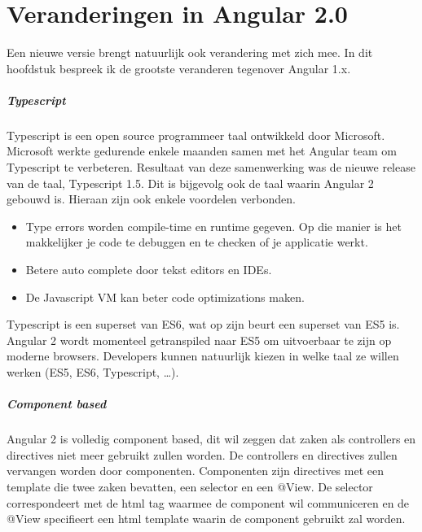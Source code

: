 \documentclass[pdftex,a4paper,12pt,twoside]{report}
\begin{document}
\chapter{Veranderingen in Angular 2.0}
\label{ch:veranderingen}
Een nieuwe versie brengt natuurlijk ook verandering met zich mee. In dit hoofdstuk bespreek ik de grootste veranderen tegenover Angular 1.x.

\paragraph{Typescript}
Typescript is een open source programmeer taal ontwikkeld door Microsoft. Microsoft werkte gedurende enkele maanden samen met het Angular team om Typescript te verbeteren. Resultaat van deze samenwerking was de nieuwe release van de taal, Typescript 1.5. Dit is bijgevolg ook de taal waarin Angular 2 gebouwd is. Hieraan zijn ook enkele voordelen verbonden.  

\begin{itemize}
    	\item Type errors worden compile-time en runtime gegeven. Op die manier is het makkelijker je code te debuggen en te checken of je applicatie werkt.
	\item Betere auto complete door tekst editors en IDEs.
	\item De Javascript VM kan beter code optimizations maken.
\end{itemize}

Typescript is een superset van ES6, wat op zijn beurt een superset van ES5 is. Angular 2 wordt momenteel getranspiled naar ES5 om uitvoerbaar te zijn op moderne browsers. Developers kunnen natuurlijk kiezen in welke taal ze willen werken (ES5, ES6, Typescript, \ldots).
\par

\paragraph{Component based}
Angular 2 is volledig component based, dit wil zeggen dat zaken als controllers en directives niet meer gebruikt zullen worden. De controllers en directives zullen vervangen worden door componenten. Componenten zijn directives met een template die twee zaken bevatten, een selector en een @View. De selector correspondeert met de html tag waarmee de component wil communiceren en de @View specifieert een html template waarin de component gebruikt zal worden.
\par
\end{document}
